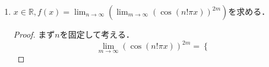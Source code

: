 \documentclass{ltjsarticle}
\theoremstyle{definition}
\theoremstyle{propcorollarystyle}
\theoremstyle{thmcorollarystyle}
\begin{document}
\begin{enumerate}[label={\arabic*}),itemsep=1em]
\begin{enumerate}[label=({\roman*}),itemsep=1pt,parsep=0pt]
    \item $a_n = \sqrt[n]{a}　(a>0)$.
      \begin{proof}
        対数をとると，$\log a_n=\frac{1}{n}\log a$と変形できるため，$\lim_{n \rightarrow \infty} \log a_n = 0$.\\
        以上の結果から，題意の数列の極限は1に収束する．
      \end{proof}
    \item $a_n = \frac{n!}{n^n}$.
      \begin{proof}
        \begin{align*}
          \lim_{n \rightarrow \infty} a_n &= \lim_{n \rightarrow \infty} \frac{n!}{n^n} \\
          &= \lim_{n \rightarrow \infty} \frac{n}{n} \cdot \frac{n-1}{n} \cdot \cdots \cdot \frac{1}{n} \\
          &= \lim_{n \rightarrow \infty} 1 \cdot 1 \cdot \cdots \cdot 0 \\
          &= 0.
        \end{align*}
      \end{proof}
    \item $a_n = \frac{n}{2^n}$.
      \begin{proof}
        二項定理から
        \begin{align*}
          \frac{n}{2^n} &= \frac{n}{(1+1)^n} \\
          &\le \frac{n}{1+n+\frac{n(n-1)}{2}}
        \end{align*}
        とあらわせるため，挟み撃ちの原理から題意の数列の極限は0に収束する．
      \end{proof}
    \item $a_n = \sqrt{n+1}-\sqrt{n}$.
    \begin{proof}
      \begin{align*}
        0 \le a_n &= \frac{1}{\sqrt{n+1}+\sqrt{n}} \\
        &\le \frac{1}{2\sqrt{n}}
      \end{align*}
      はさみうちの原理から，$a_n$の極限は0に収束する．
    \end{proof}
  \end{enumerate}
  \item $x \in \mathbb{R},f(x)=\lim_{n \rightarrow \infty} (\lim_{m \rightarrow \infty} (\cos(n!\pi x))^{2m})$を求める．
  \begin{proof}
    まず$n$を固定して考える．\\
    \[
    \lim_{m \rightarrow \infty} (\cos(n!\pi x))^{2m} = 
    \begin{cases}

\end{cases}\]
\end{proof}
\end{enumerate}
\end{document}
